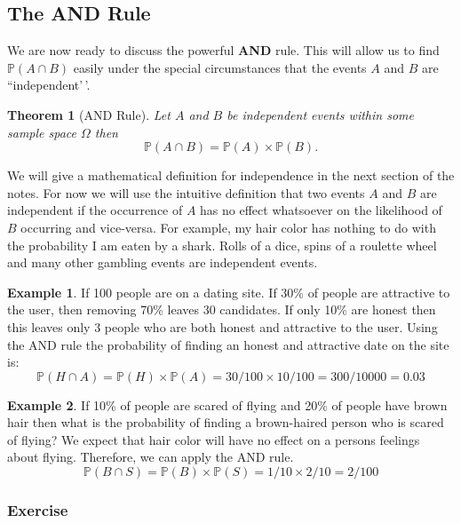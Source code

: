\documentclass[
]{book}
\newcommand{\prob}[1]{{\mathbb{P}(#1)}}
\newtheorem{theorem}{Theorem}[chapter]
\theoremstyle{definition}
\theoremstyle{definition}
\newtheorem{example}{Example}[chapter]
\theoremstyle{definition}
\theoremstyle{definition}
\theoremstyle{remark}
\begin{document}
\hypertarget{the-and-rule}{%
\subsection{The AND Rule}\label{the-and-rule}}

We are now ready to discuss the powerful \textbf{AND} rule. This will allow us to find \(\prob{A \cap B}\) easily under the special circumstances that the events \(A\) and \(B\) are ``independent'\,'.

\begin{theorem}[AND Rule]
\protect\hypertarget{thm:unnamed-chunk-229}{}\label{thm:unnamed-chunk-229}Let \(A\) and \(B\) be independent events within some sample space \(\Omega\) then \[\prob{A \cap B}=\prob{A} \times \prob{B}.\]
\end{theorem}

We will give a mathematical definition for independence in the next section of the notes. For now we will use the intuitive definition that two events \(A\) and \(B\) are independent if the occurrence of \(A\) has no effect whatsoever on the likelihood of \(B\) occurring and vice-versa. For example, my hair color has nothing to do with the probability I am eaten by a shark. Rolls of a dice, spins of a roulette wheel and many other gambling events are independent events.

\begin{example}
\protect\hypertarget{exm:unnamed-chunk-230}{}\label{exm:unnamed-chunk-230}If 100 people are on a dating site. If 30\% of people are attractive to the user, then removing 70\% leaves 30 candidates. If only 10\% are honest then this leaves only 3 people who are both honest and attractive to the user. Using the AND rule the probability of finding an honest and attractive date on the site is: \[\prob{H \cap A}=\prob{H}\times \prob{A}=30/100 \times 10/100=300/10000=0.03\]
\end{example}

\begin{example}
\protect\hypertarget{exm:unnamed-chunk-231}{}\label{exm:unnamed-chunk-231}If 10\% of people are scared of flying and 20\% of people have brown hair then what is the probability of finding a brown-haired person who is scared of flying? We expect that hair color will have no effect on a persons feelings about flying. Therefore, we can apply the AND rule. \[\prob{B \cap S}=\prob{B} \times \prob{S}=1/10 \times 2 /10=2/100\]
\end{example}

\hypertarget{exercise}{%
\subsubsection{Exercise}\label{exercise}}
\end{document}
